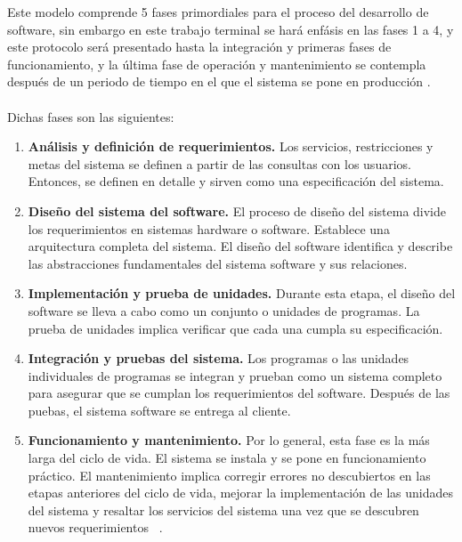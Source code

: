 Este modelo comprende 5 fases primordiales para el proceso del desarrollo de software, sin embargo en este trabajo terminal se hará enfásis en las fases 1 a 4, y este protocolo será presentado hasta la integración y primeras fases de funcionamiento, y la última fase de operación y mantenimiento se contempla después de un periodo de tiempo en el que el sistema se pone en producción .\\ \\
Dichas fases son las siguientes: 

\begin{enumerate}
	\item \textbf{Análisis y definición de requerimientos.} Los servicios, restricciones y metas del sistema se definen a partir de las consultas con los usuarios. Entonces, se definen en detalle y sirven como una especificación del sistema.
	\item \textbf{Diseño del sistema del software.} El proceso de diseño del sistema divide los requerimientos en sistemas hardware o software. Establece una arquitectura completa del sistema. El diseño del software identifica y describe las abstracciones fundamentales del sistema software y sus relaciones.
	\item \textbf{Implementación y prueba de unidades.} Durante esta etapa, el diseño del software se lleva a cabo como un conjunto o unidades de programas. La prueba de unidades implica verificar que cada una cumpla su especificación. 
	\item \textbf{Integración y pruebas del sistema.} Los programas o las unidades individuales de programas se integran y prueban como un sistema completo para asegurar que se cumplan los requerimientos del software. Después de las puebas, el sistema software se entrega al cliente. 
	\item \textbf{Funcionamiento y mantenimiento.} Por lo general, esta fase es la más larga del ciclo de vida. El sistema se instala y se pone en funcionamiento práctico. El mantenimiento implica corregir errores no descubiertos en las etapas anteriores del ciclo de vida, mejorar la implementación de las unidades del sistema y resaltar los servicios del sistema una vez que se descubren nuevos requerimientos ~\cite{sommerville}. 

\end{enumerate}




